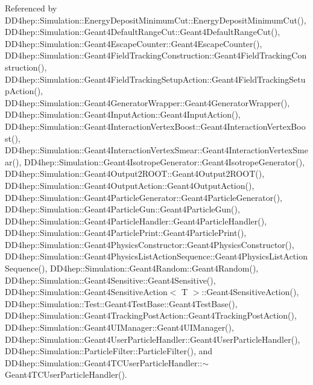 Referenced by D\+D4hep\+::\+Simulation\+::\+Energy\+Deposit\+Minimum\+Cut\+::\+Energy\+Deposit\+Minimum\+Cut(), D\+D4hep\+::\+Simulation\+::\+Geant4\+Default\+Range\+Cut\+::\+Geant4\+Default\+Range\+Cut(), D\+D4hep\+::\+Simulation\+::\+Geant4\+Escape\+Counter\+::\+Geant4\+Escape\+Counter(), D\+D4hep\+::\+Simulation\+::\+Geant4\+Field\+Tracking\+Construction\+::\+Geant4\+Field\+Tracking\+Construction(), D\+D4hep\+::\+Simulation\+::\+Geant4\+Field\+Tracking\+Setup\+Action\+::\+Geant4\+Field\+Tracking\+Setup\+Action(), D\+D4hep\+::\+Simulation\+::\+Geant4\+Generator\+Wrapper\+::\+Geant4\+Generator\+Wrapper(), D\+D4hep\+::\+Simulation\+::\+Geant4\+Input\+Action\+::\+Geant4\+Input\+Action(), D\+D4hep\+::\+Simulation\+::\+Geant4\+Interaction\+Vertex\+Boost\+::\+Geant4\+Interaction\+Vertex\+Boost(), D\+D4hep\+::\+Simulation\+::\+Geant4\+Interaction\+Vertex\+Smear\+::\+Geant4\+Interaction\+Vertex\+Smear(), D\+D4hep\+::\+Simulation\+::\+Geant4\+Isotrope\+Generator\+::\+Geant4\+Isotrope\+Generator(), D\+D4hep\+::\+Simulation\+::\+Geant4\+Output2\+R\+O\+O\+T\+::\+Geant4\+Output2\+R\+O\+O\+T(), D\+D4hep\+::\+Simulation\+::\+Geant4\+Output\+Action\+::\+Geant4\+Output\+Action(), D\+D4hep\+::\+Simulation\+::\+Geant4\+Particle\+Generator\+::\+Geant4\+Particle\+Generator(), D\+D4hep\+::\+Simulation\+::\+Geant4\+Particle\+Gun\+::\+Geant4\+Particle\+Gun(), D\+D4hep\+::\+Simulation\+::\+Geant4\+Particle\+Handler\+::\+Geant4\+Particle\+Handler(), D\+D4hep\+::\+Simulation\+::\+Geant4\+Particle\+Print\+::\+Geant4\+Particle\+Print(), D\+D4hep\+::\+Simulation\+::\+Geant4\+Physics\+Constructor\+::\+Geant4\+Physics\+Constructor(), D\+D4hep\+::\+Simulation\+::\+Geant4\+Physics\+List\+Action\+Sequence\+::\+Geant4\+Physics\+List\+Action\+Sequence(), D\+D4hep\+::\+Simulation\+::\+Geant4\+Random\+::\+Geant4\+Random(), D\+D4hep\+::\+Simulation\+::\+Geant4\+Sensitive\+::\+Geant4\+Sensitive(), D\+D4hep\+::\+Simulation\+::\+Geant4\+Sensitive\+Action$<$ T $>$\+::\+Geant4\+Sensitive\+Action(), D\+D4hep\+::\+Simulation\+::\+Test\+::\+Geant4\+Test\+Base\+::\+Geant4\+Test\+Base(), D\+D4hep\+::\+Simulation\+::\+Geant4\+Tracking\+Post\+Action\+::\+Geant4\+Tracking\+Post\+Action(), D\+D4hep\+::\+Simulation\+::\+Geant4\+U\+I\+Manager\+::\+Geant4\+U\+I\+Manager(), D\+D4hep\+::\+Simulation\+::\+Geant4\+User\+Particle\+Handler\+::\+Geant4\+User\+Particle\+Handler(), D\+D4hep\+::\+Simulation\+::\+Particle\+Filter\+::\+Particle\+Filter(), and D\+D4hep\+::\+Simulation\+::\+Geant4\+T\+C\+User\+Particle\+Handler\+::$\sim$\+Geant4\+T\+C\+User\+Particle\+Handler().

\hypertarget{class_d_d4hep_1_1_simulation_1_1_geant4_action_ad00f53780d6155fb3ab806a68a284762}{}\label{class_d_d4hep_1_1_simulation_1_1_geant4_action_ad00f53780d6155fb3ab806a68a284762} 

